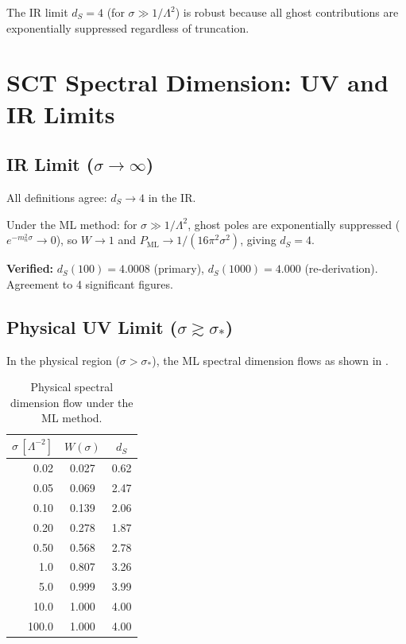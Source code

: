 \documentclass[11pt,a4paper]{article}
\newcommand{\ds}{d_S}
\begin{document}
The IR limit $\ds = 4$ (for $\sigma \gg 1/\Lambda^2$) is robust because
all ghost contributions are exponentially suppressed regardless of
truncation.


\section{SCT Spectral Dimension: UV and IR Limits}
\label{sec:results}

\subsection{IR Limit ($\sigma \to \infty$)}

All definitions agree: $\ds \to 4$ in the IR.

Under the ML method: for $\sigma \gg 1/\Lambda^2$, ghost poles are
exponentially suppressed ($e^{-m_n^2\sigma} \to 0$), so $W \to 1$
and $P_{\mathrm{ML}} \to 1/(16\pi^2\sigma^2)$, giving $\ds = 4$.

\textcolor{proven}{\textbf{Verified:}} $\ds(100) = 4.0008$ (primary),
$\ds(1000) = 4.000$ (re-derivation). Agreement to 4 significant figures.

\subsection{Physical UV Limit ($\sigma \gtrsim \sigma_*$)}

In the physical region ($\sigma > \sigma_*$), the ML spectral dimension
flows as shown in .

\begin{table}[h]
\centering
\begin{tabular}{rcc}
\toprule
$\sigma\,[\Lambda^{-2}]$ & $W(\sigma)$ & $\ds$ \\
\midrule
0.02  & 0.027 & 0.62 \\
0.05  & 0.069 & 2.47 \\
0.10  & 0.139 & 2.06 \\
0.20  & 0.278 & 1.87 \\
0.50  & 0.568 & 2.78 \\
1.0   & 0.807 & 3.26 \\
5.0   & 0.999 & 3.99 \\
10.0  & 1.000 & 4.00 \\
100.0 & 1.000 & 4.00 \\
\bottomrule
\end{tabular}
\caption{Physical spectral dimension flow under the ML method.}
\label{tab:ds-flow}
\end{table}
\end{document}
